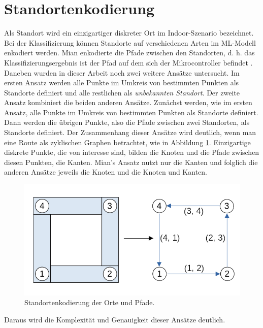 \section{Standortenkodierung}
Als Standort wird ein einzigartiger diskreter Ort im Indoor-Szenario bezeichnet.
Bei der Klassifizierung können Standorte auf verschiedenen Arten im ML-Modell enkodiert werden.
Mian enkodierte die Pfade zwischen den Standorten, d. h. das Klassifizierungsergebnis ist der Pfad auf dem sich der Mikrocontroller befindet \cite{naveedThesis}.
\newline
\newline
Daneben wurden in dieser Arbeit noch zwei weitere Ansätze untersucht.
Im ersten Ansatz werden alle Punkte im Umkreis von bestimmten Punkten als Standorte definiert und alle restlichen als \textit{unbekannten Standort}.
Der zweite Ansatz kombiniert die beiden anderen Ansätze.
Zunächst werden, wie im ersten Ansatz, alle Punkte im Umkreis von bestimmten Punkten als Standorte definiert.
Dann werden die übrigen Punkte, also die Pfade zwischen zwei Standorten, als Standorte definiert.
\newline
\newline
Der Zusammenhang dieser Ansätze wird deutlich, wenn man eine Route als zyklischen Graphen betrachtet, wie in Abbildung \ref{fig:location_encoding}.
Einzigartige diskrete Punkte, die von interesse sind, bilden die Knoten und die Pfade zwischen diesen Punkten, die Kanten.
Mian's Ansatz nutzt nur die Kanten und folglich die anderen Ansätze jeweils die Knoten und die Knoten und Kanten.
\begin{figure}[h!]
    \centering
    \includegraphics[width=\linewidth]{images/location_encoding.png}
    \caption{Standortenkodierung der Orte und Pfade.}
    \label{fig:location_encoding}
\end{figure}
\newline
Daraus wird die Komplexität und Genauigkeit dieser Ansätze deutlich.
